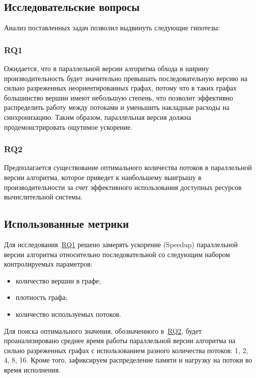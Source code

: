 \subsection{Исследовательские вопросы}
Анализ поставленных задач позволил выдвинуть следующие гипотезы:
{\parindent0pt
    
    \subsubsection*{RQ1}
    \label{RQ1}
    Ожидается, что в параллельной версии алгоритма обхода в ширину производительность будет значительно превышать последовательную версию на сильно разреженных неориентированных графах, потому что в таких графах большинство вершин имеют небольшую степень, что позволит эффективно распределить работу между потоками и уменьшить накладные расходы на синхронизацию. Таким образом, параллельная версия должна продемонстрировать ощутимое ускорение.
}
{\parindent0pt
    \subsubsection*{RQ2}
    \label{RQ2}
    Предполагается существование оптимального количества потоков в параллельной версии алгоритма, которое приведет к наибольшему выигрышу в производительности за счет эффективного использования доступных ресурсов вычислительной системы.
}

\subsection{Использованные метрики}

Для исследования~\hyperref[RQ1]{RQ1} решено замерять ускорение (Speedup) параллельной версии алгоритма относительно последовательной со следующим набором контролируемых параметров:
\begin{itemize}
    \item количество вершин в графе;
    \item плотность графа;
    \item количество используемых потоков.
\end{itemize}

Для поиска оптимального значения, обозначенного в~\hyperref[RQ2]{RQ2}, будет проанализировано среднее время работы параллельной версии алгоритма на сильно разреженных графах с использованием разного количества потоков: 1, 2, 4, 8, 16. Кроме того, зафиксируем распределение памяти и нагрузку на потоки во время исполнения.

